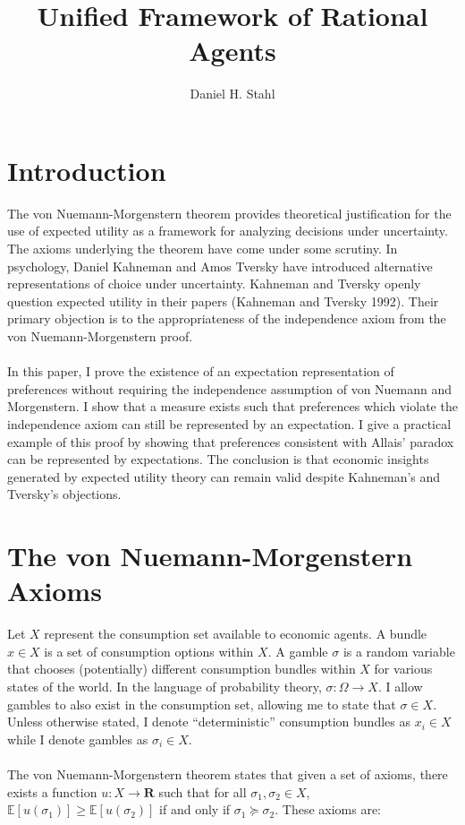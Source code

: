 \documentclass{article}
\begin{document}
	
	
\title{Unified Framework of Rational Agents}
\date{}
\author{Daniel H. Stahl}

\section{Introduction}

The von Nuemann-Morgenstern theorem provides theoretical justification for the use of expected utility as a framework for analyzing decisions under uncertainty.  The axioms underlying the theorem have come under some scrutiny.  In psychology, Daniel Kahneman and Amos Tversky have introduced alternative representations of choice under uncertainty.  Kahneman and Tversky openly question expected utility in their papers (Kahneman and Tversky 1992).  Their primary objection is to the appropriateness of the independence axiom from the von Nuemann-Morgenstern proof.    
\\
\\
In this paper, I prove the existence of an expectation representation of preferences without requiring the independence assumption of von Nuemann and Morgenstern.  I show that a measure exists such that preferences which violate the independence axiom can still be represented by an expectation.  I give a practical example of this proof by showing that preferences consistent with Allais' paradox can be represented by expectations.  The conclusion is that economic insights generated by expected utility theory can remain valid despite Kahneman's and Tversky's objections.   

\section{The von Nuemann-Morgenstern Axioms}

Let \(X\) represent the consumption set available to economic agents.  A bundle \(x \in X\) is a set of consumption options within \(X\).  A gamble \(\sigma\) is a random variable that chooses (potentially) different consumption bundles within \(X\) for various states of the world.  In the language of probability theory, \(\sigma: \Omega \to X\).  I allow gambles to also exist in the consumption set, allowing me to state that \(\sigma \in X\).  Unless otherwise stated, I denote ``deterministic'' consumption bundles as \(x_i \in X\) while I denote gambles as \(\sigma_i \in X\).     
\\
\\
The von Nuemann-Morgenstern theorem states that given a set of axioms, there exists a function \(u: X \to \mathbf{R}\) such that for all \(\sigma_1, \sigma_2 \in X\), \(\mathbb{E}\left[u(\sigma_1)\right] \geq \mathbb{E}\left[u(\sigma_2)\right]\) if and only if \(\sigma_1 \succeq  \sigma_2\).  These axioms are:
\end{document}
